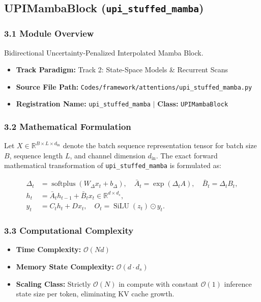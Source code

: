 \subsection{UPIMambaBlock (\texttt{upi\_stuffed\_mamba})}
\label{sec:app_module_upi_stuffed_mamba}

\subsubsection*{3.1 Module Overview}
Bidirectional Uncertainty-Penalized Interpolated Mamba Block.
\begin{itemize}
    \item \textbf{Track Paradigm:} Track 2: State-Space Models \& Recurrent Scans
    \item \textbf{Source File Path:} \texttt{Codes/framework/attentions/upi\_stuffed\_mamba.py}
    \item \textbf{Registration Name:} \texttt{upi\_stuffed\_mamba} $\mid$ \textbf{Class:} \texttt{UPIMambaBlock}
\end{itemize}

\subsubsection*{3.2 Mathematical Formulation}
Let $X \in \mathbb{R}^{B \times L \times d_{\text{in}}}$ denote the batch sequence representation tensor for batch size $B$, sequence length $L$, and channel dimension $d_{\text{in}}$. The exact forward mathematical transformation of \texttt{upi\_stuffed\_mamba} is formulated as:

\begin{align}
\Delta_t &= \operatorname{softplus}(W_\Delta x_t + b_\Delta), \quad \bar{A}_t = \exp(\Delta_t A), \quad \bar{B}_t = \Delta_t B_t, \\
h_t &= \bar{A}_t h_{t-1} + \bar{B}_t x_t \in \mathbb{R}^{d \times d_s}, \\
y_t &= C_t h_t + D x_t, \quad O_t = \operatorname{SiLU}(z_t) \odot y_t.
\end{align}


\subsubsection*{3.3 Computational Complexity}
\begin{itemize}
    \item \textbf{Time Complexity:} $\mathcal{O}(N d)$
    \item \textbf{Memory State Complexity:} $\mathcal{O}(d \cdot d_s)$
    \item \textbf{Scaling Class:} Strictly $\mathcal{O}(N)$ in compute with constant $\mathcal{O}(1)$ inference state size per token, eliminating KV cache growth.
\end{itemize}

